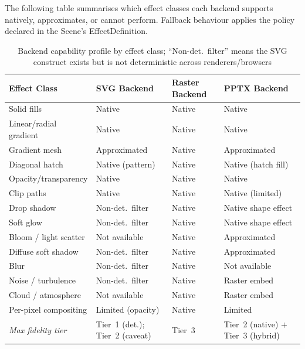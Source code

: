 The following table summarises which effect classes each backend supports natively,
approximates, or cannot perform. Fallback behaviour applies the policy declared in the
Scene's EffectDefinition.

\begin{table}[h]
\centering
\small
\begin{tabularx}{\textwidth}{lXXX}
\toprule
\textbf{Effect Class} & \textbf{SVG Backend} & \textbf{Raster Backend} & \textbf{PPTX Backend} \\
\midrule
Solid fills            & Native               & Native                  & Native \\
Linear/radial gradient & Native               & Native                  & Native \\
Gradient mesh          & Approximated         & Native                  & Approximated \\
Diagonal hatch         & Native (pattern)     & Native                  & Native (hatch fill) \\
Opacity/transparency   & Native               & Native                  & Native \\
Clip paths             & Native               & Native                  & Native (limited) \\
Drop shadow            & Non-det.\ filter     & Native                  & Native shape effect \\
Soft glow              & Non-det.\ filter     & Native                  & Native shape effect \\
Bloom / light scatter  & Not available        & Native                  & Approximated \\
Diffuse soft shadow    & Non-det.\ filter     & Native                  & Approximated \\
Blur                   & Non-det.\ filter     & Native                  & Not available \\
Noise / turbulence     & Non-det.\ filter     & Native                  & Raster embed \\
Cloud / atmosphere     & Not available        & Native                  & Raster embed \\
Per-pixel compositing  & Limited (opacity)    & Native                  & Limited \\
\midrule
\textit{Max fidelity tier} & Tier~1 (det.); Tier~2 (caveat) & Tier~3 & Tier~2 (native) $+$ Tier~3 (hybrid) \\
\bottomrule
\end{tabularx}
\caption{Backend capability profile by effect class; ``Non-det.\ filter'' means the SVG
  construct exists but is not deterministic across renderers/browsers}
\label{tab:backend-capability}
\end{table}

